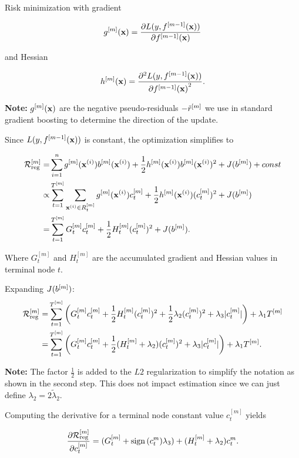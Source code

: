 \documentclass[11pt,compress,t,notes=noshow, xcolor=table]{beamer}
\begin{document}
\begin{vbframe}{Risk minimization}
    with gradient

    $$
    g^{[m]}(\mathbf{x}) = \frac{\partial L(y, f^{[m-1]}(\mathbf{x}))}{\partial f^{[m-1]}(\mathbf{x})}
    $$

    and Hessian

    $$
    h^{[m]}(\mathbf{x}) = \frac{\partial^2 L(y, f^{[m-1]}(\mathbf{x}))}{\partial {f^{[m-1]}(\mathbf{x})}^2}.
    $$

    \textbf{Note:} $g^{[m]}(\mathbf{x})$ are the negative pseudo-residuals $-\tilde{r}^{[m]}$ we use in standard gradient boosting to determine the direction of the update.

    \framebreak

    Since $L(y, f^{[m-1]}(\mathbf{x}))$ is constant, the optimization simplifies to

    \begin{align*}
    \mathcal{R}_{\text{reg}}^{[m]} = &\sum_{i = 1}^n g^{[m]}(\mathbf{x}^{(i)})b^{[m]}(\mathbf{x}^{(i)}) + \frac12 h^{[m]}(\mathbf{x}^{(i)})b^{[m]}(\mathbf{x}^{(i)})^2 + J(b^{[m]}) + const\\
    \propto&\sum_{t=1}^{T^{[m]}}\sum_{\mathbf{x}^{(i)}\in R_t^{[m]}} g^{[m]}(\mathbf{x}^{(i)})c^{[m]}_t + \frac12 h^{[m]}(\mathbf{x}^{(i)})(c^{[m]}_t)^2 + J(b^{[m]}) \\
    =& \sum_{t=1}^{T^{[m]}}G^{[m]}_t c^{[m]}_t+\frac12 H^{[m]}_t (c^{[m]}_t)^2 + J(b^{[m]}).
    \end{align*}

    Where $G^{[m]}_t$ and $H^{[m]}_t$ are the accumulated gradient and Hessian values in terminal node $t$.



    \framebreak

    Expanding $J(b^{[m]})$:
    \begin{align*}
    \mathcal{R}_{\text{reg}}^{[m]} = &\sum_{t=1}^{T^{[m]}}\left(G^{[m]}_t c^{[m]}_t+\frac12 H^{[m]}_t (c^{[m]}_t)^2 + \frac12\lambda_2(c^{[m]}_t)^2 + \lambda_3 |c^{[m]}_t|\right) + \lambda_1 T^{[m]}\\
    =&\sum_{t=1}^{T^{[m]}}\left(G^{[m]}_t c^{[m]}_t+\frac12 (H^{[m]}_t + \lambda_2) (c^{[m]}_t)^2 + \lambda_3 |c_t^{[m]}|\right) + \lambda_1 T^{[m]}.
    \end{align*}

    \lz

    \textbf{Note:} The factor $\frac12$ is added to the $L2$ regularization to simplify the notation as shown in the second step.
    This does not impact estimation since we can just define $\lambda_2 = 2\tilde\lambda_2$.

    \framebreak

    Computing the derivative for a terminal node constant value $c^{[m]}_t$ yields

    $$
    \frac{\partial \mathcal{R}_{\text{reg}}^{[m]}}{\partial c^{[m]}_t} = (G^{[m]}_t + \operatorname{sign}{(c^{m}_t)}\lambda_3) + (H^{[m]}_t + \lambda_2) c^{m}_t.
    $$


\end{vbframe}
\end{document}
